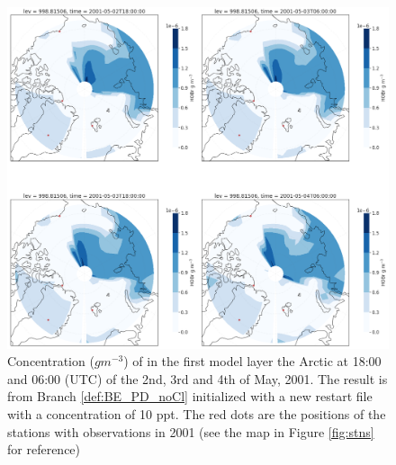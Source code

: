 \begin{figure}[h]
    \centering
    \includegraphics[width=\linewidth]{Chapter6_Results/images/polarHOBr_newRestart.png}
    \caption{Concentration ($g m^{-3}$) of  in the first model layer the Arctic at 18:00 and 06:00 (UTC) of the 2nd, 3rd and 4th of May, 2001. The result is from Branch \ref{def:BE_PD_noCl} initialized with a new restart file with a  concentration of 10 ppt. The red dots are the positions of the stations with observations in 2001 (see the map in Figure \ref{fig:stns} for reference)}
    \label{fig:polarHOBr_newRestart}
\end{figure}